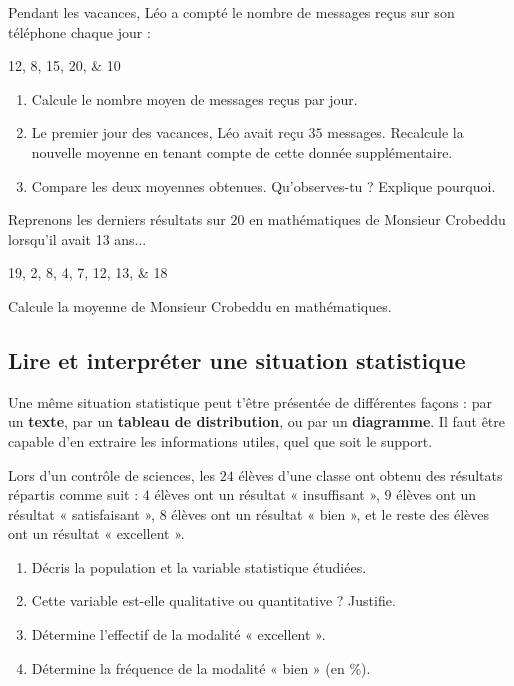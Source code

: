 \documentclass[../../syllabus_1.tex]{subfiles}
\begin{document}
\newpage
\begin{exercise}
    Pendant les vacances, Léo a compté le nombre de messages reçus sur son téléphone chaque jour :
    \begin{center}
        \numlist{12;8;15;20;10}
    \end{center}
    \begin{enumerate}[itemsep=1cm]
        \item Calcule le nombre moyen de messages reçus par jour.
        \item Le premier jour des vacances, Léo avait reçu $35$ messages. Recalcule la nouvelle moyenne en tenant compte de cette donnée supplémentaire.
        \item Compare les deux moyennes obtenues. Qu'observes-tu ? Explique pourquoi.
    \end{enumerate}
\end{exercise}
\vspace{2cm}

\begin{exercise}
    Reprenons les derniers résultats sur $20$ en mathématiques de Monsieur Crobeddu lorsqu'il avait 13 ans...
    \begin{center}
        \numlist{19;2;8;4;7;12;13;18}
    \end{center}
    Calcule la moyenne de Monsieur Crobeddu en mathématiques.
\end{exercise}

\newpage
\subsection{Lire et interpréter une situation statistique}

Une même situation statistique peut t'être présentée de différentes façons : par un \textbf{texte}, par un \textbf{tableau de distribution}, ou par un \textbf{diagramme}. Il faut être capable d'en extraire les informations utiles, quel que soit le support.

\begin{exercise}
    Lors d'un contrôle de sciences, les $24$ élèves d'une classe ont obtenu des résultats répartis comme suit : $4$ élèves ont un résultat « insuffisant », $9$ élèves ont un résultat « satisfaisant », $8$ élèves ont un résultat « bien », et le reste des élèves ont un résultat « excellent ».
    \begin{enumerate}[itemsep=1cm]
        \item Décris la population et la variable statistique étudiées.
        \item Cette variable est-elle qualitative ou quantitative ? Justifie.
        \item Détermine l'effectif de la modalité « excellent ».
        \item Détermine la fréquence de la modalité « bien » (en \%).
    \end{enumerate}
\end{exercise}
\vspace{1cm}
\end{document}
